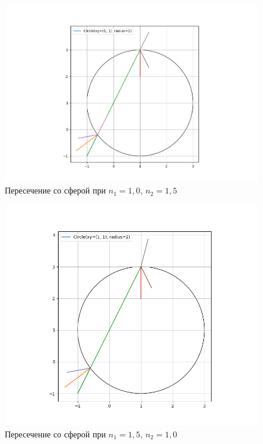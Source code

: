 {	\begin{figure}[H]
		\includegraphics[width=0.7\pagewidth]{sph_intersect1}
		\centering
		\caption{Пересечение со сферой при $n_1 = 1,0$, $n_2 = 1,5$}
		\label{sph_intersect1}
	\end{figure}
	
	\begin{figure}[H]
		\includegraphics[width=0.7\pagewidth]{sph_intersect2}
		\centering
		\caption{Пересечение со сферой при $n_1 = 1,5$, $n_2 = 1,0$}
		\label{sph_intersect2}
	\end{figure}
	
}
